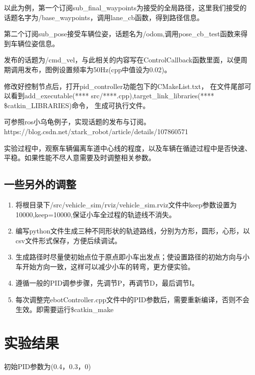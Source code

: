 \documentclass{xjtureport}
\begin{document}
以此为例，第一个订阅sub\_final\_waypoints为接受的全局路径，这里我们接受的话题名字为/base\_waypoints，调用lane\_cb函数，得到路径信息。

第二个订阅sub\_pose接受车辆位姿，话题名为/odom,调用pose\_cb\_test函数来得到车辆位姿信息。

发布的话题为/cmd\_vel，与此相关的内容写在ControlCallback函数里面，以便周期调用发布，图例设置频率为50Hz(cpp中值设为0.02)。

修改好控制节点后，打开pid\_controller功能包下的CMakeList.txt，
在文件尾部可以看到add\_executable(**** src/****.cpp),target\_link\_libraries(**** \${catkin\_LIBRARIES})命令，
生成可执行文件。

可参照ros小乌龟例子，实现话题的发布与订阅。
https://blog.csdn.net/xtark\_robot/article/details/107860571

实验过程中，观察车辆偏离车道中心线的程度，以及车辆在循迹过程中是否快速、平稳。如果性能不尽人意需要及时调整相关参数。
\subsection{一些另外的调整}
\begin{enumerate}
    \item 将根目录下/src/vehicle\_sim/rviz/vehicle\_sim.rviz文件中keep参数设置为10000,keep=10000,保证小车全过程的轨迹线不消失。
    \item 编写python文件生成三种不同形状的轨迹路线，分别为方形，圆形，心形，以csv文件形式保存，方便后续调试。
    \item 生成路径时尽量使初始点位于原点即小车出发点；使设置路径的初始方向与小车开始方向一致，这样可以减少小车的转弯，更方便实验。
    \item 遵循一般的PID调参步骤，先调节P，再调节D，最后调节I。
    \item 每次调整完ebotController.cpp文件中的PID参数后，需要重新编译，否则不会生效。即需要运行\$catkin\_make 
\end{enumerate}

\section{实验结果}
初始PID参数为(0.4，0.3，0)
\end{document}
